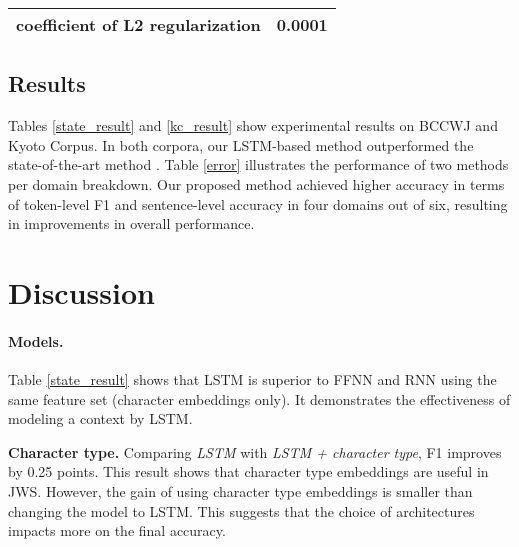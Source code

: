 \documentclass[11pt,letterpaper]{article}
\begin{document}
\begin{table}[t]
\begin{center}
\begin{tabular}{p{50mm}| r }
    coefficient of L2  regularization & 0.0001\\ %
   \bottomrule
     \end{tabular}                                                                                                                                                                                                                                                                                                           
    \end{center}                                                                                                                                                                                                                                                                                                            
 \end{table}
 
                  
\subsection{Results}
Tables \ref{state_result} and \ref{kc_result} show experimental results on BCCWJ and Kyoto Corpus. In both corpora, our LSTM-based method outperformed the state-of-the-art method \cite{neubig-nakata-mori:2011:ACL-HLT2011}. Table \ref{error} illustrates the performance of two methods per domain breakdown. Our proposed method achieved higher accuracy in terms of token-level F1 and sentence-level accuracy in four domains out of six, resulting in improvements in overall performance.


\section{Discussion}
\paragraph{Models.}
Table \ref{state_result} shows that LSTM is superior to FFNN and RNN using the same feature set (character embeddings only). It demonstrates the effectiveness of modeling a context by LSTM.

\noindent
{\bf Character type.} Comparing {\it LSTM} with {\it LSTM + character type}, F1 improves by 0.25 points. This result shows that character type embeddings are useful in JWS. However, the gain of using character type embeddings is smaller than changing the model to LSTM. 
This suggests that the choice of architectures impacts more on the final accuracy.
\end{document}
